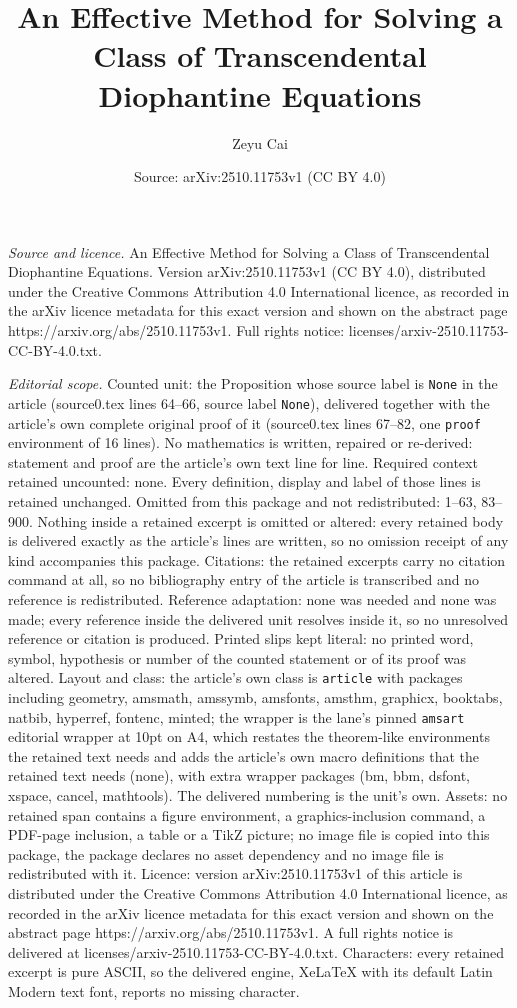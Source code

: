 \documentclass[10pt,a4paper]{amsart}
\title[An Effective Method for Solving a Class of Transcendental Di]{An Effective Method for Solving a Class of Transcendental Diophantine Equations}
\author{Zeyu Cai}
\date{Source: arXiv:2510.11753v1 (CC BY 4.0)}
\begin{document}
\maketitle

\noindent\emph{Source and licence.} An Effective Method for Solving a Class of Transcendental Diophantine Equations. Version arXiv:2510.11753v1 (CC BY 4.0), distributed under the Creative Commons Attribution 4.0 International licence, as recorded in the arXiv licence metadata for this exact version and shown on the abstract page https://arxiv.org/abs/2510.11753v1. Full rights notice: licenses/arxiv-2510.11753-CC-BY-4.0.txt.\par\smallskip

\noindent\textit{Editorial scope.} Counted unit: the Proposition whose source label is \texttt{None} in the article (source0.tex lines 64--66, source label \texttt{None}), delivered together with the article's own complete original proof of it (source0.tex lines 67--82, one \texttt{proof} environment of 16 lines). No mathematics is written, repaired or re-derived: statement and proof are the article's own text line for line. Required context retained uncounted: none. Every definition, display and label of those lines is retained unchanged. Omitted from this package and not redistributed: 1--63, 83--900. Nothing inside a retained excerpt is omitted or altered: every retained body is delivered exactly as the article's lines are written, so no omission receipt of any kind accompanies this package. Citations: the retained excerpts carry no citation command at all, so no bibliography entry of the article is transcribed and no reference is redistributed. Reference adaptation: none was needed and none was made; every reference inside the delivered unit resolves inside it, so no unresolved reference or citation is produced. Printed slips kept literal: no printed word, symbol, hypothesis or number of the counted statement or of its proof was altered. Layout and class: the article's own class is \texttt{article} with packages including geometry, amsmath, amssymb, amsfonts, amsthm, graphicx, booktabs, natbib, hyperref, fontenc, minted; the wrapper is the lane's pinned \texttt{amsart} editorial wrapper at 10pt on A4, which restates the theorem-like environments the retained text needs and adds the article's own macro definitions that the retained text needs (none), with extra wrapper packages (bm, bbm, dsfont, xspace, cancel, mathtools). The delivered numbering is the unit's own. Assets: no retained span contains a figure environment, a graphics-inclusion command, a PDF-page inclusion, a table or a TikZ picture; no image file is copied into this package, the package declares no asset dependency and no image file is redistributed with it. Licence: version arXiv:2510.11753v1 of this article is distributed under the Creative Commons Attribution 4.0 International licence, as recorded in the arXiv licence metadata for this exact version and shown on the abstract page https://arxiv.org/abs/2510.11753v1. A full rights notice is delivered at licenses/arxiv-2510.11753-CC-BY-4.0.txt. Characters: every retained excerpt is pure ASCII, so the delivered engine, XeLaTeX with its default Latin Modern text font, reports no missing character.
\end{document}
